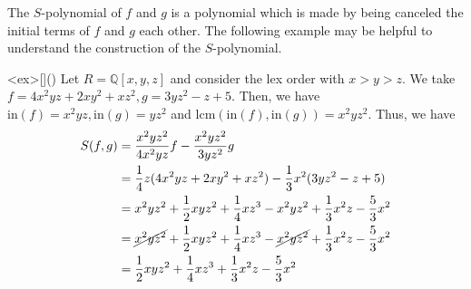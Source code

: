 \documentclass{article}
\begin{document}
The $S$-polynomial of $f$ and $g$ is a polynomial which is made by being canceled the initial terms of $f$ and $g$ each other. The following example may be helpful to understand the construction of the $S$-polynomial.

\begin{statementsp}<ex>[]()
    Let $R = \mathbb{Q}[x,y,z]$ and consider the lex order with $x > y > z$. We take $f = 4x^2yz + 2xy^2 + xz^2, g = 3yz^2 - z + 5$. Then, we have $\mathrm{in}(f) = x^2yz, \mathrm{in}(g) = yz^2$ and $\mathrm{lcm}(\mathrm{in}(f), \mathrm{in}(g)) = x^2yz^2$. Thus, we have
    \begin{align}
        S(f,g) &= \frac{x^2yz^2}{4x^2yz} f - \frac{x^2yz^2}{3yz^2} g \\
        &= \frac{1}{4} z (4x^2yz + 2xy^2 + xz^2) - \frac{1}{3} x^2 (3yz^2 - z + 5) \\
        &= x^2yz^2 + \frac{1}{2} xyz^2 + \frac{1}{4} xz^3 - x^2yz^2 + \frac{1}{3} x^2 z - \frac{5}{3} x^2 \\
        &= \cancel{x^2yz^2} + \frac{1}{2} xyz^2 + \frac{1}{4} xz^3 - \cancel{x^2yz^2} + \frac{1}{3} x^2 z - \frac{5}{3} x^2 \\
        &= \frac{1}{2} xyz^2 + \frac{1}{4} xz^3 + \frac{1}{3} x^2 z - \frac{5}{3} x^2
    \end{align}
\end{statementsp}



\newpage 

{}

\end{document}
